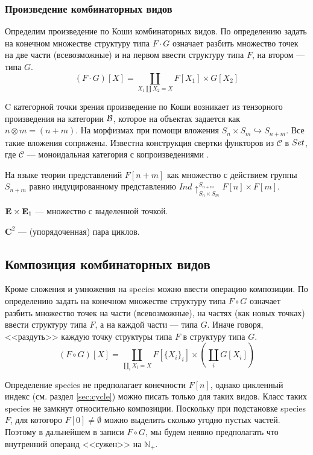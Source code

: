 \subsubsection{Произведение комбинаторных видов} 
Определим произведение по Коши комбинаторных видов. По определению задать на
конечном множестве структуру типа $F \cdot G$ означает разбить множество точек 
на две части (всевозможные) и на первом ввести структуру типа $F$,
на втором --- типа $G$. 
$$(F \cdot G)[X] = \coprod\limits_{X_1 \coprod X_2 =
X}F[X_1] \times G[X_2]$$


C категорной точки зрения произведение по Коши возникает из тензорного
произведения на категории $\mathcal B$, которое на объектах задается как $n \otimes m = (n + m)$.
На морфизмах при помощи вложения $S_n \times S_m \hookrightarrow S_{n+m}$. Все
такие вложения сопряжены.
Известна конструкция свертки функторов из $\mathcal C$ в $Set$, где
$\mathcal C$ --- моноидальная категория с копроизведениями
\href{http://nlab.mathforge.org/nlab/show/Day+convolution}{\cite{Day}}.


На языке теории представлений $F[n+m]$ как множество с действием группы
$S_{n+m}$ равно индуцированному представлению $Ind \uparrow_{S_n \times S_m}
^{S_{n+m}} F[n]\times F[m]$.

\begin{example}
$\mathbf E \times \mathbf E_1$ --- множество с выделенной точкой.
\end{example}
\begin{example}
$\mathbf C^2$ --- (упорядоченная) пара циклов.
\end{example}

\subsection{Композиция комбинаторных видов}
Кроме сложения и умножения на species можно ввести операцию композиции.
По определению задать на конечном множестве структуру типа $F \circ G$ означает
разбить множество точек на части (всевозможные), на частях (как новых точках)
ввести структуру типа $F$, а на каждой части --- типа $G$. Иначе говоря, <<раздуть>>
каждую точку структуры типа $F$ в структуру типа $G$.
$$
(F \circ G)[X] =
\coprod\limits_{\coprod\limits_i X_i = X} F[\{X_i\}_i] \times
(\coprod\limits_{i} G[X_i]) 
$$

\begin{remark}
Определение species не предполагает конечности $F[n]$, однако цикленный индекс
(см. раздел \ref{sec:cycle}) можно писать только для таких видов. Класс таких
species не замкнут относительно композиции. Поскольку при подстановке
species $F$, для котогоро $F[0] \neq \emptyset$ можно выделить сколько угодно пустых
частей. Поэтому в дальнейшем в записи $F \circ G$, мы будем неявно предполагать
что внутренний операнд <<сужен>> на $\mathbb N_{+}$.
\end{remark}

